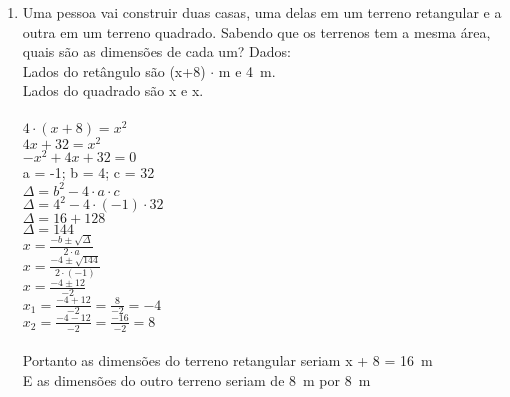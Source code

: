 \documentclass[a4paper,14pt]{article}
\begin{document}
\begin{enumerate}
		
		\item Uma pessoa vai construir duas casas, uma delas em um terreno retangular e a outra em um terreno quadrado. Sabendo que os terrenos tem a mesma área, quais são as dimensões de cada um?    
		Dados:  \\ 
		Lados do retângulo são (x+8) $\cdot$ m e 4~m. \\ 
		Lados do quadrado são x e x. \\
		\\ 
		$4 \cdot (x+8) = x^2$ \\
		$4x + 32 = x^2$ \\
		$-x^2 +4x +32 = 0$ \\
		a = -1; b = 4; c = 32 \\
		$\Delta = b^2 - 4 \cdot a \cdot c$ \\
		$\Delta = 4^2 - 4 \cdot (-1) \cdot 32$ \\
		$\Delta = 16 + 128$ \\
		$\Delta = 144$ \\
		$x = \frac{-b \pm{\sqrt{\Delta}}}{2 \cdot a}$ \\
		$x = \frac{-4 \pm{\sqrt{144}}}{2 \cdot (-1)}$ \\
		$x = \frac{-4 \pm{12}}{-2}$ \\
		$x_1 = \frac{-4 + 12}{-2} = \frac{8}{-2} = -4$ \\
		$x_2 = \frac{-4 - 12}{-2} = \frac{-16}{-2} = 8$ \\
		\\
		Portanto as dimensões do terreno retangular seriam x + 8 = 16~m \\
		E as dimensões do outro terreno seriam de 8~m por 8~m 
		\vspace{10cm}
	\end{enumerate}
	
\end{document}
